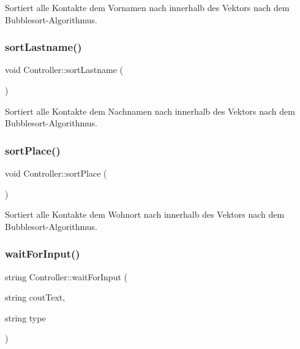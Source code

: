 Sortiert alle Kontakte dem Vornamen nach innerhalb des Vektors nach dem Bubblesort-\/\+Algorithmus.

\mbox{\label{classContactManager_1_1Controller_acc4da7b605dfc2fd6acba5bb8b14a36a}} 
\subsubsection{\texorpdfstring{sort\+Lastname()}{sortLastname()}}
{\footnotesize\ttfamily void Controller\+::sort\+Lastname (\begin{DoxyParamCaption}{ }\end{DoxyParamCaption})}



Sortiert alle Kontakte dem Nachnamen nach innerhalb des Vektors nach dem Bubblesort-\/\+Algorithmus.

\mbox{\label{classContactManager_1_1Controller_acfb43d6054e00cb959f71c993851f172}} 
\subsubsection{\texorpdfstring{sort\+Place()}{sortPlace()}}
{\footnotesize\ttfamily void Controller\+::sort\+Place (\begin{DoxyParamCaption}{ }\end{DoxyParamCaption})}



Sortiert alle Kontakte dem Wohnort nach innerhalb des Vektors nach dem Bubblesort-\/\+Algorithmus.

\mbox{\label{classContactManager_1_1Controller_a7de8c795f0a2e8d6eba2cf1710504ad2}} 
\subsubsection{\texorpdfstring{wait\+For\+Input()}{waitForInput()}\hspace{0.1cm}{\footnotesize\ttfamily [1/2]}}
{\footnotesize\ttfamily string Controller\+::wait\+For\+Input (\begin{DoxyParamCaption}\item[{string}]{cout\+Text,  }\item[{string}]{type }\end{DoxyParamCaption})\hspace{0.3cm}{\ttfamily [static]}}



